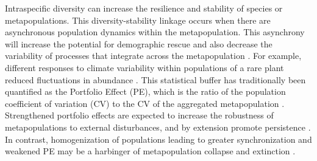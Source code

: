 \documentclass{revtex4}
\begin{document}
Intraspecific diversity can increase the resilience and stability of species or metapopulations. 
This diversity-stability linkage occurs when there are asynchronous population dynamics within the metapopulation. 
This asynchrony will increase the potential for demographic rescue \citep{Brown:1977gk,Earn:2000fm} and also decrease the variability of processes that integrate across the metapopulation \citep{Anonymous:2015gf}. 
For example, different responses to climate variability within populations of a rare plant reduced fluctuations in abundance \citep{Abbott:2017hl}. 
This statistical buffer has traditionally been quantified as the Portfolio Effect (PE), which is the ratio of the population coefficient of variation (CV) to the CV of the aggregated metapopulation \citep{Thibaut:2012km}. 
Strengthened portfolio effects are expected to increase the robustness of metapopulations to external disturbances, and by extension promote persistence \citep{Thibaut:2012km}.
In contrast, homogenization of populations leading to greater synchronization and weakened PE may be a harbinger of metapopulation collapse and extinction \citep{Carlson:2011ce}.
\end{document}

